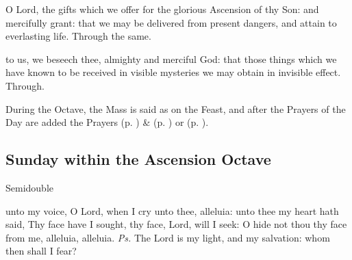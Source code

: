 
\secret
{} O Lord, the gifts which we offer for the glorious Ascension of thy Son: and mercifully grant: that we may be delivered from present dangers, and attain to everlasting life. Through the same.


\vspace{-0.25\baselineskip}

\postcommunion

\vspace{-0.1\baselineskip}

 to us, we beseech thee, almighty and merciful God: that those things which we have known to be received in visible mysteries we may obtain in invisible effect. Through.

\begin{rubric}
    During the Octave, the Mass is said as on the Feast, and after the Prayers of the Day are added the  Prayers  (p. \pageref{SPMaryInEaster}) \&   (p. \pageref{SPAgainst}) or  (p. \pageref{SPChiefBishop}).
\end{rubric}


\subsection{Sunday within the Ascension Octave}
\begin{inhead}
    {Semidouble}
\end{inhead}


\vspace{-0.25\baselineskip}

\introit

\vspace{-0.15\baselineskip}

 unto my voice, O Lord, when I cry unto thee, alleluia: unto thee my heart hath said, Thy face have I sought, thy face, Lord, will I seek: O hide not thou thy face from me, alleluia, alleluia. \textit{Ps.} The Lord is my light, and my salvation: whom then shall I fear?

